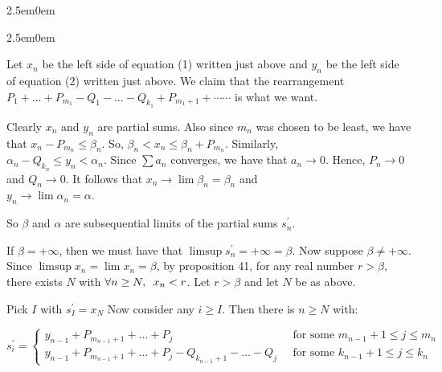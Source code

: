 \documentclass{book}
\newcommand{\hTwo}{%
   \color{MidnightBlue}%
   \fontsize{13}{15}\selectfont%
}
\newcommand{\hThree}{%
   \color{PineGreen}
   \fontsize{13}{15}\selectfont%
}
\newenvironment{myIndent}{%
   \begin{adjustwidth}{2.5em}{0em}%
}{%
   \end{adjustwidth}%
}
\newcommand{\retTwo}{\hfill\bigbreak}
\newcommand{\myHS}{ \hspace{0.5em}}
\begin{document}
      {\begin{myIndent}\hTwo
      {\begin{myIndent}\hThree

         Let $x_n$ be the left side of equation (1) written just above and $y_n$ be the left side of equation (2) written just above. We claim that the rearrangement\\ $P_1 + \ldots + P_{m_1} - Q_1 - \ldots - Q_{k_1} + P_{m_1 + 1} + \cdots\cdots$ is what we want. \retTwo

         Clearly $x_n$ and $y_n$ are partial sums. Also since $m_n$ was chosen to be least, we have that $x_n - P_{m_n} \leq \beta_n$. So, $\beta_n < x_n \leq \beta_n + P_{m_n}$. Similarly,\\ $\alpha_n - Q_{k_n} \leq y_n < \alpha_n$. Since $\sum a_n$ converges, we have that $a_n \rightarrow 0$. Hence, $P_n \rightarrow 0$ and  $Q_n \rightarrow 0$. It follows that $x_n \rightarrow \lim{\beta_n} = \beta_n$ and\\ $y_n \rightarrow \lim{\alpha_n} = \alpha$.\retTwo

         So $\beta$ and $\alpha$ are subsequential limits of the partial sums $s_n^\prime$.

         \newpage

         If $\beta = +\infty$, then we must have that $\limsup{s_n^\prime} = +\infty = \beta$. Now suppose $\beta \neq +\infty$. Since $\limsup{x_n} = \lim{x_n} = \beta$, by proposition 41, for any real number $r > \beta$, there exists $N$ with $\forall n \geq N, \myHS x_n < r$. Let $r > \beta$ and let $N$ be as above. \retTwo

         Pick $I$ with $s_I^\prime = x_N$ Now consider any $i \geq I$. Then there is $n \geq N$ with:
      \end{myIndent}}
      \end{myIndent}}{\hThree
      $s_i^\prime = \left\{
      \begin{matrix}
         y_{n-1} + P_{m_{n-1}+1} + \ldots + P_j\phantom{aaaaaaaaaaaaaaaaaa} & \text{ for some } m_{n-1} + 1 \leq j \leq m_n \\
         y_{n-1} + P_{m_{n-1}+1} + \ldots + P_j - Q_{k_{n-1}+1} - \ldots - Q_j & \text{ for some } k_{n-1} + 1 \leq j \leq k_n\phantom{a.}
      \end{matrix}\right.$\retTwo
      }
\end{document}
